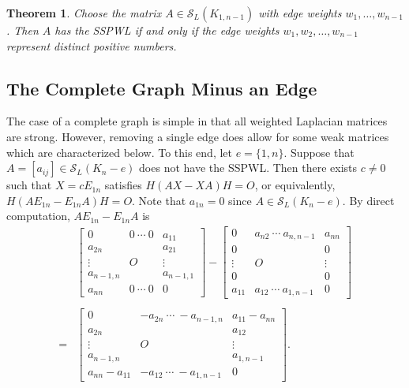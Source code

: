 \documentclass{article}
\newtheorem{theorem}{Theorem}[section]
\theoremstyle{definition}
\newcommand{\mptn}{\mathcal{S}}
\begin{document}
\begin{theorem}
\label{thm:weakstar}
Choose the matrix $A \in \mptn_L(K_{1,n-1})$ with edge weights $w_1, \dots, w_{n-1}$. Then
$A$ has the SSPWL if and only if the edge weights $w_1, w_2, \ldots, w_{n-1}$ represent distinct positive numbers.
\end{theorem}

\subsection{The Complete Graph Minus an Edge}
\label{ssec:knme}

The case of a complete graph is simple in that all weighted Laplacian matrices are strong. However, removing a single edge does allow for some weak matrices which are characterized below. To this end, 
let $e = \{1, n\}.$ Suppose that $A = [a_{ij}] \in \mptn_L(K_n - e)$ does not have the SSPWL. Then there exists $c \neq 0$ such that $X = cE_{1n}$ satisfies $H(AX - XA)H = O$,  or equivalently, $H(AE_{1n} - E_{1n}A)H = O$.  Note that $a_{1n} = 0$ since $A\in\mptn_L(K_n - e)$.  By direct computation, $AE_{1n} - E_{1n}A$ is
\[
\begin{array}{cl}
 &  \left[\begin{array}{c|c|c}
0 & 0 \  \cdots  \ 0 & a_{11}\\
\hline
a_{2n} & & a_{21} \\
\vdots & O & \vdots \\
a_{n-1, n} & & a_{n-1,1}\\
\hline
a_{nn} & 0 \ \cdots \ 0 & 0
\end{array}
\right]
-
\left[\begin{array}{c|c|c}
0 & a_{n2} \  \cdots  \ a_{n,n-1} & a_{nn}\\
\hline
0 &  & 0\\
\vdots & O & \vdots \\
0 &  & 0\\
\hline
a_{11} & a_{12} \ \cdots \ a_{1,n-1}& 0
\end{array}
\right] \\
 & \\
 = & 
\left[\begin{array}{c|c|c}
0 & -a_{2n} \  \cdots  \ -a_{n-1,n} & a_{11} - a_{nn}\\
\hline
a_{2n} & & a_{12} \\
\vdots & O & \vdots \\
a_{n-1, n} & & a_{1, n-1}\\
\hline
a_{nn} - a_{11} & -a_{12} \ \cdots \ -a_{1,n-1}& 0
\end{array}
\right].
\end{array}
\]
\end{document}
